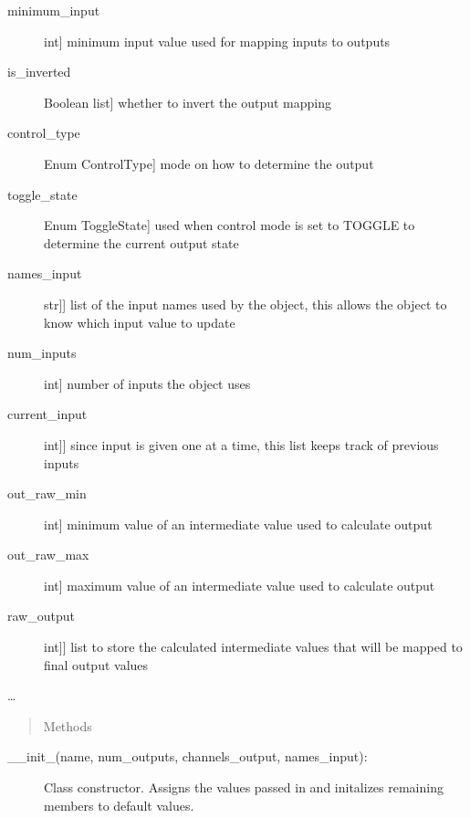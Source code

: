 \documentclass[letterpaper,10pt,english]{sphinxmanual}
\begin{document}
\begin{fulllineitems}
\begin{description}
\item[{minimum\_input}] \leavevmode{[}int{]}
\sphinxAtStartPar
minimum input value used for mapping inputs to outputs

\item[{is\_inverted}] \leavevmode{[}Boolean list{]}
\sphinxAtStartPar
whether to invert the output mapping

\item[{control\_type}] \leavevmode{[}Enum ControlType{]}
\sphinxAtStartPar
mode on how to determine the output

\item[{toggle\_state}] \leavevmode{[}Enum ToggleState{]}
\sphinxAtStartPar
used when control mode is set to TOGGLE to determine the current output state

\item[{names\_input}] \leavevmode{[}{[}str{]}{]}
\sphinxAtStartPar
list of the input names used by the object, this allows the object to know which input value to update

\item[{num\_inputs}] \leavevmode{[}int{]}
\sphinxAtStartPar
number of inputs the object uses

\item[{current\_input}] \leavevmode{[}{[}int{]}{]}
\sphinxAtStartPar
since input is given one at a time, this list keeps track of previous inputs

\item[{out\_raw\_min}] \leavevmode{[}int{]}
\sphinxAtStartPar
minimum value of an intermediate value used to calculate output

\item[{out\_raw\_max}] \leavevmode{[}int{]}
\sphinxAtStartPar
maximum value of an intermediate value used to calculate output

\item[{raw\_output}] \leavevmode{[}{[}int{]}{]}
\sphinxAtStartPar
list to store the calculated intermediate values that will be mapped to final output values

\end{description}

\sphinxAtStartPar
…
\begin{quote}\begin{description}
\item[{Methods}] \leavevmode
\end{description}\end{quote}
\begin{description}
\item[{\_\_init\_(name, num\_outputs, channels\_output, names\_input):}] \leavevmode
\sphinxAtStartPar
Class constructor. Assigns the values passed in and initalizes remaining members to default values.


\end{description}
\end{fulllineitems}
\end{document}
